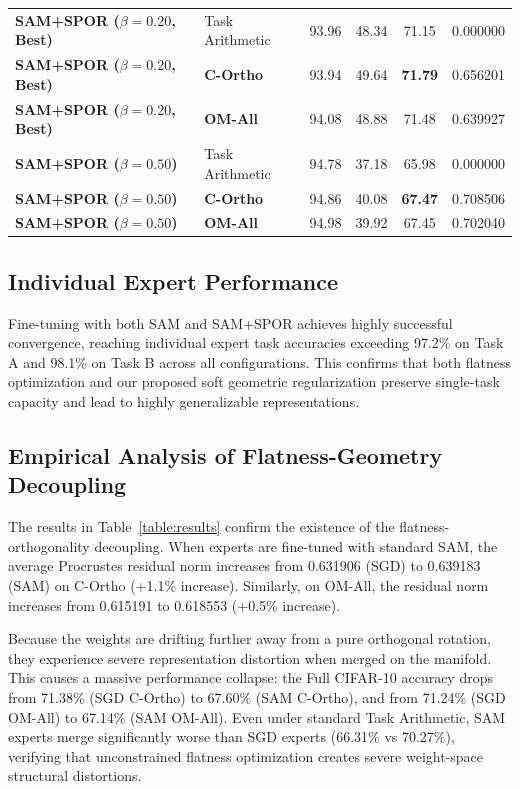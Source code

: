 \documentclass{article}
\theoremstyle{plain}
\theoremstyle{definition}
\theoremstyle{remark}
\begin{document}
\begin{table}[t]
\begin{center}
\begin{small}
\begin{sc}
\begin{tabular}{llcccc}
\midrule
\textbf{SAM+SPOR ($\beta=0.20$, Best)} & Task Arithmetic & 93.96 & 48.34 & 71.15 & 0.000000 \\
\textbf{SAM+SPOR ($\beta=0.20$, Best)} & \textbf{C-Ortho} & 93.94 & 49.64 & \textbf{71.79} & 0.656201 \\
\textbf{SAM+SPOR ($\beta=0.20$, Best)} & \textbf{OM-All} & 94.08 & 48.88 & 71.48 & 0.639927 \\
\midrule
\textbf{SAM+SPOR ($\beta=0.50$)} & Task Arithmetic & 94.78 & 37.18 & 65.98 & 0.000000 \\
\textbf{SAM+SPOR ($\beta=0.50$)} & \textbf{C-Ortho} & 94.86 & 40.08 & \textbf{67.47} & 0.708506 \\
\textbf{SAM+SPOR ($\beta=0.50$)} & \textbf{OM-All} & 94.98 & 39.92 & 67.45 & 0.702040 \\
\bottomrule
\end{tabular}
\end{sc}
\end{small}
\end{center}
\vskip -0.1in
\end{table}

\subsection{Individual Expert Performance}
Fine-tuning with both SAM and SAM+SPOR achieves highly successful convergence, reaching individual expert task accuracies exceeding 97.2\% on Task A and 98.1\% on Task B across all configurations. This confirms that both flatness optimization and our proposed soft geometric regularization preserve single-task capacity and lead to highly generalizable representations.

\subsection{Empirical Analysis of Flatness-Geometry Decoupling}
The results in Table~\ref{table:results} confirm the existence of the flatness-orthogonality decoupling. When experts are fine-tuned with standard SAM, the average Procrustes residual norm increases from 0.631906 (SGD) to 0.639183 (SAM) on C-Ortho (+1.1\% increase). Similarly, on OM-All, the residual norm increases from 0.615191 to 0.618553 (+0.5\% increase).

Because the weights are drifting further away from a pure orthogonal rotation, they experience severe representation distortion when merged on the manifold. This causes a massive performance collapse: the Full CIFAR-10 accuracy drops from 71.38\% (SGD C-Ortho) to 67.60\% (SAM C-Ortho), and from 71.24\% (SGD OM-All) to 67.14\% (SAM OM-All). Even under standard Task Arithmetic, SAM experts merge significantly worse than SGD experts (66.31\% vs 70.27\%), verifying that unconstrained flatness optimization creates severe weight-space structural distortions.
\end{document}
